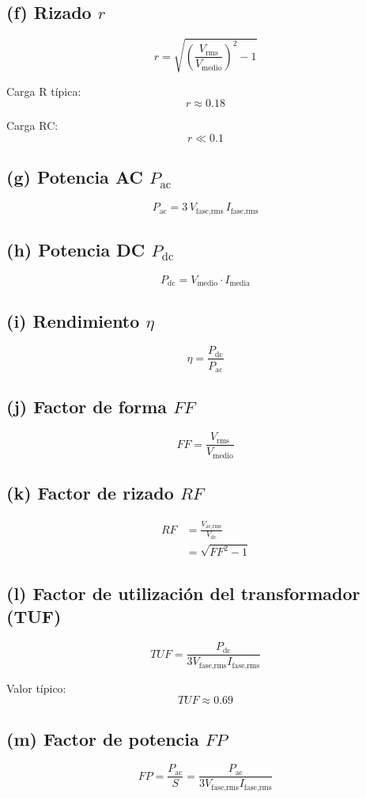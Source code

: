 \subsection*{(f) Rizado $r$}
\[
r = \sqrt{\left(\frac{V_{\text{rms}}}{V_{\text{medio}}}\right)^2 - 1}
\]

Carga R típica:
\[
r \approx 0.18
\]

Carga RC:
\[
r \ll 0.1
\]

\subsection*{(g) Potencia AC $P_{\text{ac}}$}
\[
P_{\text{ac}} = 3 \, V_{\text{fase,rms}} \, I_{\text{fase,rms}}
\]

\subsection*{(h) Potencia DC $P_{\text{dc}}$}
\[
P_{\text{dc}} = V_{\text{medio}} \cdot I_{\text{media}}
\]

\subsection*{(i) Rendimiento $\eta$}
\[
\eta = \frac{P_{\text{dc}}}{P_{\text{ac}}}
\]

\subsection*{(j) Factor de forma $FF$}
\[
FF = \frac{V_{\text{rms}}}{V_{\text{medio}}}
\]

\subsection*{(k) Factor de rizado $RF$}
\begin{align*}
	RF &= \frac{V_{\text{ac,rms}}}{V_{\text{dc}}} \\
	&= \sqrt{FF^2 - 1}
\end{align*}

\subsection*{(l) Factor de utilización del transformador (TUF)}
\[
TUF = \frac{P_{\text{dc}}}{3V_{\text{fase,rms}} I_{\text{fase,rms}}}
\]

Valor típico:
\[
TUF \approx 0.69
\]

\subsection*{(m) Factor de potencia $FP$}
\[
FP = \frac{P_{\text{ac}}}{S} = \frac{P_{\text{ac}}}{3V_{\text{fase,rms}} I_{\text{fase,rms}}}
\]

